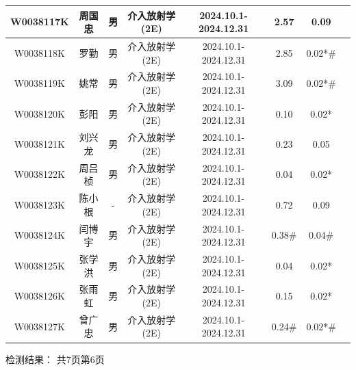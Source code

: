 \begin{table}[H]
\begin{tabular}{|c|c|c|c|c|c|c|c|}
\hline
W0038117K & 周国忠 & 男 & 介入放射学(2E) & 2024.10.1-2024.12.31 & 2.57 & 0.09 &  \\
\hline
W0038118K & 罗勤 & 男 & 介入放射学(2E) & 2024.10.1-2024.12.31 & 2.85 & 0.02*\# &  \\
\hline
W0038119K & 姚常 & 男 & 介入放射学(2E) & 2024.10.1-2024.12.31 & 3.09 & 0.02*\# &  \\
\hline
W0038120K & 彭阳 & 男 & 介入放射学(2E) & 2024.10.1-2024.12.31 & 0.10 & 0.02* &  \\
\hline
W0038121K & 刘兴龙 & 男 & 介入放射学(2E) & 2024.10.1-2024.12.31 & 0.23 & 0.05 &  \\
\hline
W0038122K & 周吕桢 & 男 & 介入放射学(2E) & 2024.10.1-2024.12.31 & 0.04 & 0.02* &  \\
\hline
W0038123K & 陈小根 & - & 介入放射学(2E) & 2024.10.1-2024.12.31 & 0.72 & 0.09 &  \\
\hline
W0038124K & 闫博宇 & 男 & 介入放射学(2E) & 2024.10.1-2024.12.31 & 0.38\# & 0.04\# &  \\
\hline
W0038125K & 张学洪 & 男 & 介入放射学(2E) & 2024.10.1-2024.12.31 & 0.04 & 0.02* &  \\
\hline
W0038126K & 张雨虹 & 男 & 介入放射学(2E) & 2024.10.1-2024.12.31 & 0.15 & 0.02* &  \\
\hline
W0038127K & 曾广忠 & 男 & 介入放射学(2E) & 2024.10.1-2024.12.31 & 0.24\# & 0.02*\# &  \\
\hline
\end{tabular}
\end{table}


检测结果：
共7页第6页

